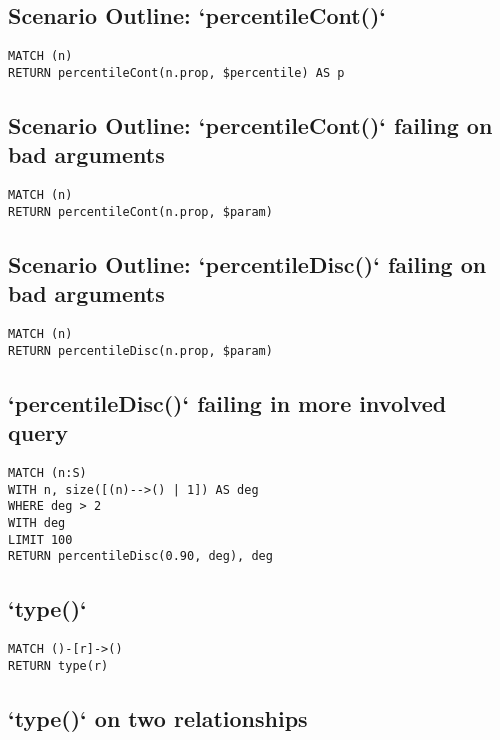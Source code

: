 \subsection{Scenario Outline: `percentileCont()`}

\begin{lstlisting}
MATCH (n)
RETURN percentileCont(n.prop, $percentile) AS p
\end{lstlisting}

\subsection{Scenario Outline: `percentileCont()` failing on bad arguments}

\begin{lstlisting}
MATCH (n)
RETURN percentileCont(n.prop, $param)
\end{lstlisting}

\subsection{Scenario Outline: `percentileDisc()` failing on bad arguments}

\begin{lstlisting}
MATCH (n)
RETURN percentileDisc(n.prop, $param)
\end{lstlisting}

\subsection{`percentileDisc()` failing in more involved query}

\begin{lstlisting}
MATCH (n:S)
WITH n, size([(n)-->() | 1]) AS deg
WHERE deg > 2
WITH deg
LIMIT 100
RETURN percentileDisc(0.90, deg), deg
\end{lstlisting}

\subsection{`type()`}

\begin{lstlisting}
MATCH ()-[r]->()
RETURN type(r)
\end{lstlisting}

\subsection{`type()` on two relationships}

